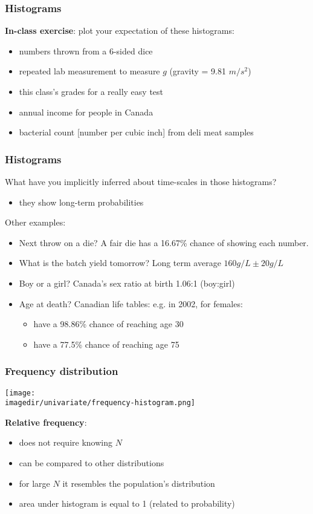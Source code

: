 \begin{frame}\frametitle{Histograms}
	\textbf{In-class exercise}: plot your expectation of these histograms: \vspace{2cm}
	\begin{itemize}
		\item numbers thrown from a 6-sided dice
		\item repeated lab measurement to measure $g$ (gravity = 9.81 $m/s^2$)
		\item this class's grades for a really easy test
		\item annual income for people in Canada
		\item bacterial count [number per cubic inch] from deli meat samples
	\end{itemize}
\end{frame}

\begin{frame}\frametitle{Histograms}
	What have you implicitly inferred about time-scales in those histograms?
	\begin{itemize}
		\item they show long-term probabilities
	\end{itemize}

	Other examples:
	\begin{itemize}
		\item Next throw on a die? A fair die has a 16.67\% chance of showing each number.
		\item What is the batch yield tomorrow? Long term average $160 g/L \pm 20 g/L$
		\item Boy or a girl? Canada's sex ratio at birth 1.06:1 (boy:girl)
		\item Age at death? Canadian life tables: e.g. in 2002, for females:
		\begin{itemize}
			\item have a 98.86\% chance of reaching age 30
			\item have a 77.5\% chance of reaching age 75
		\end{itemize}
	\end{itemize}
\end{frame}

\begin{frame}\frametitle{Frequency distribution}
	\begin{center}
		\texttt{[image: \\imagedir/univariate/frequency-histogram.png]}
	\end{center}
	\textbf{Relative frequency}:
	\begin{itemize}
		\item does not require knowing $N$
		\item can be compared to other distributions
		\item for large $N$ it resembles the population's distribution
		\item area under histogram is equal to 1 (related to probability)
	\end{itemize}
\end{frame}


